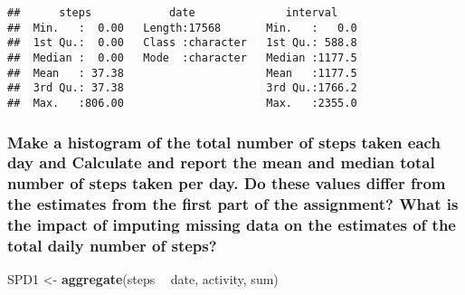 \documentclass[
]{article}
\newenvironment{Shaded}{\begin{snugshade}}{\end{snugshade}}
\newcommand{\DataTypeTok}[1]{\textcolor[rgb]{0.13,0.29,0.53}{#1}}
\newcommand{\KeywordTok}[1]{\textcolor[rgb]{0.13,0.29,0.53}{\textbf{#1}}}
\newcommand{\NormalTok}[1]{#1}
\newcommand{\OperatorTok}[1]{\textcolor[rgb]{0.81,0.36,0.00}{\textbf{#1}}}
\newcommand{\OtherTok}[1]{\textcolor[rgb]{0.56,0.35,0.01}{#1}}
\newcommand{\StringTok}[1]{\textcolor[rgb]{0.31,0.60,0.02}{#1}}
\begin{document}
\begin{Shaded}
\end{Shaded}

\begin{verbatim}
##      steps            date              interval     
##  Min.   :  0.00   Length:17568       Min.   :   0.0  
##  1st Qu.:  0.00   Class :character   1st Qu.: 588.8  
##  Median :  0.00   Mode  :character   Median :1177.5  
##  Mean   : 37.38                      Mean   :1177.5  
##  3rd Qu.: 37.38                      3rd Qu.:1766.2  
##  Max.   :806.00                      Max.   :2355.0
\end{verbatim}

\hypertarget{make-a-histogram-of-the-total-number-of-steps-taken-each-day-and-calculate-and-report-the-mean-and-median-total-number-of-steps-taken-per-day.-do-these-values-differ-from-the-estimates-from-the-first-part-of-the-assignment-what-is-the-impact-of-imputing-missing-data-on-the-estimates-of-the-total-daily-number-of-steps}{%
\subsubsection{Make a histogram of the total number of steps taken each
day and Calculate and report the mean and median total number of steps
taken per day. Do these values differ from the estimates from the first
part of the assignment? What is the impact of imputing missing data on
the estimates of the total daily number of
steps?}\label{make-a-histogram-of-the-total-number-of-steps-taken-each-day-and-calculate-and-report-the-mean-and-median-total-number-of-steps-taken-per-day.-do-these-values-differ-from-the-estimates-from-the-first-part-of-the-assignment-what-is-the-impact-of-imputing-missing-data-on-the-estimates-of-the-total-daily-number-of-steps}}

\begin{Shaded}
\begin{Highlighting}[]
\NormalTok{SPD1 <-}\StringTok{ }\KeywordTok{aggregate}\NormalTok{(steps }\OperatorTok{~}\StringTok{ }\NormalTok{date, activity, sum)}
\end{Highlighting}
\end{Shaded}
\end{document}
